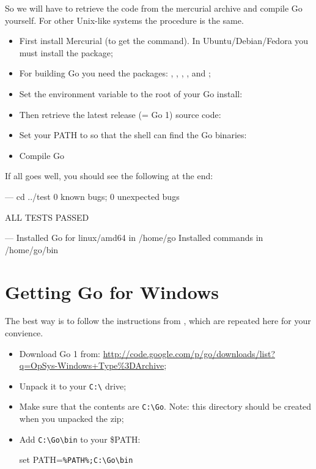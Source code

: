 So we will have to retrieve the code from the mercurial archive and compile
Go yourself. For other Unix-like systems the procedure is the same.
\begin{itemize}
\item First install Mercurial (to get the  command). In
Ubuntu/Debian/Fedora you must install the  package;

\item For building Go you need the packages: ,
, , ,  and ;

\item Set the environment variable  to the root of your
Go install:
\begin{display}
\pr {}
\end{display}

\item Then retrieve the latest release (= Go 1) source code:
\begin{display}
\pr {}
\end{display}

\item Set your PATH to so that the shell can find the Go binaries:
\begin{display}
\pr {}
\end{display}
\item Compile Go
\begin{display}
\pr {}
\pr {}
\end{display}
\end{itemize}
If all goes well, you should see the following at the end:
\begin{display}
--- cd ../test
0 known bugs; 0 unexpected bugs

ALL TESTS PASSED

---
Installed Go for linux/amd64 in /home/go
Installed commands in /home/go/bin
\end{display}

\section{Getting Go for Windows}
The best way is to follow the instructions from \cite{go_install}, which are repeated
here for your convience.

\begin{itemize}
\item Download Go 1 from:
\url{http://code.google.com/p/go/downloads/list?q=OpSys-Windows+Type%3DArchive};
\item Unpack it to your \verb|C:\| drive;
\item Make sure that the contents are \verb|C:\Go|. Note: this directory should be
created when you unpacked the zip;
\item Add \verb|C:\Go\bin| to your \$PATH:
\begin{display}
set PATH=\verb|%PATH%;C:\Go\bin|
\end{display}
\end{itemize}

